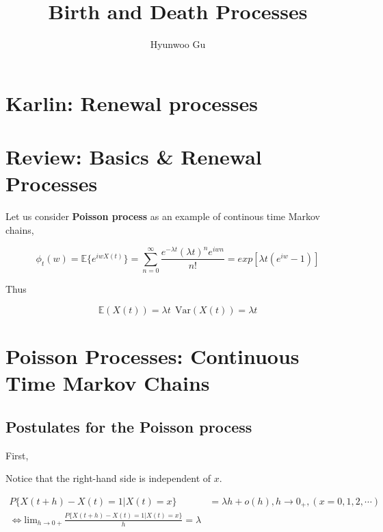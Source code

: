 \documentclass[12pt]{article}
\theoremstyle{nonumberbreak}
\begin{document}
\title{\textbf{Birth and Death Processes}}
\author{Hyunwoo Gu}
\date{}

\maketitle

\section*{Karlin: Renewal processes}
\setcounter{section}{0}


\section{Review: Basics \& Renewal Processes}



Let us consider \textbf{Poisson process} as an example of continous time Markov chains,

$$
\phi_t (w) = \mathbb{E} \{ e^{iwX(t)} \} = \sum_{n=0}^\infty \frac{e^{-\lambda t} (\lambda t)^n e^{iwn}}{n!} = exp[\lambda t (e^{iw} -1)]
$$

Thus 

$$
\mathbb{E} (X(t)) = \lambda t \ \ \mathrm{Var}(X(t)) = \lambda t
$$


\section{Poisson Processes: Continuous Time Markov Chains}


\subsection{Postulates for the Poisson process}


First, 

Notice that the right-hand side is independent of $x$. 

$$
\begin{aligned}
P\{ X(t+h) - X(t) = 1 | X(t) = x \} &= \lambda h + o(h), h \to 0_+, (x=0,1,2,\cdots) \\[10pt]
\Leftrightarrow \mathrm{lim}_{h \to 0+} \frac{P\{ X(t+h) - X(t) = 1 | X(t) = x \}}{h} = \lambda
\end{aligned}
$$
\end{document}
